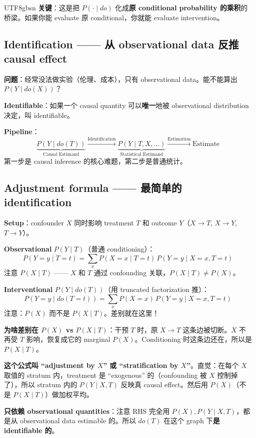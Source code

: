 \documentclass[11pt]{article}
\begin{document}
\begin{CJK}{UTF8}{gbsn}
\textbf{关键}：这是把 $P(\cdot \mid do)$ 化成\textbf{原 conditional probability 的乘积}的桥梁。如果你能 evaluate 原 conditional，你就能 evaluate intervention。

\subsection{Identification —— 从 observational data 反推 causal effect}

\textbf{问题}：经常没法做实验（伦理、成本），只有 observational data。能不能算出 $P(Y \mid do(X))$？

\textbf{Identifiable}：如果一个 causal quantity 可以\textbf{唯一}地被 observational distribution 决定，叫 identifiable。

\textbf{Pipeline}：
\[
\underbrace{P(Y \mid do(T))}_{\text{Causal Estimand}} \xrightarrow{\text{Identification}} \underbrace{P(Y \mid T, X, \ldots)}_{\text{Statistical Estimand}} \xrightarrow{\text{Estimation}} \text{Estimate}
\]
第一步是 causal inference 的核心难题，第二步是普通统计。

\subsection{Adjustment formula —— 最简单的 identification}

\textbf{Setup}：confounder $X$ 同时影响 treatment $T$ 和 outcome $Y$（$X \to T$, $X \to Y$, $T \to Y$）。

\textbf{Observational} $P(Y \mid T)$（普通 conditioning）：
\[
P(Y = y \mid T = t) = \sum_x P(X = x \mid T = t) \, P(Y = y \mid X = x, T = t)
\]
注意 $P(X \mid T)$ —— $X$ 和 $T$ 通过 confounding 关联，$P(X \mid T) \neq P(X)$。

\textbf{Interventional} $P(Y \mid do(T))$（用 truncated factorization 推）：
\[
\boxed{P(Y = y \mid do(T = t)) = \sum_x P(X = x) \, P(Y = y \mid X = x, T = t)}
\]
注意：$P(X)$ 而不是 $P(X \mid T)$。差别就在这里！

\textbf{为啥差别在 $P(X)$ vs $P(X \mid T)$}：干预 $T$ 时，原 $X \to T$ 这条边被切断。$X$ 不再受 $T$ 影响，恢复成它的 marginal $P(X)$。Conditioning 时这条边还在，所以是 $P(X \mid T)$。

\textbf{这个公式叫 ``adjustment by $X$'' 或 ``stratification by $X$''}。直觉：在每个 $X$ 取值的 stratum 内，treatment 是 ``exogenous'' 的（confounding 被 $X$ 控制掉了），所以 stratum 内的 $P(Y \mid X, T)$ 反映真 causal effect。然后用 $P(X)$（不是 $P(X \mid T)$）做加权平均。

\textbf{只依赖 observational quantities}：注意 RHS 完全用 $P(X), P(Y \mid X, T)$，都是从 observational data estimable 的。所以 $do(T)$ 在这个 graph 下\textbf{是 identifiable 的}。


\end{CJK}
\end{document}
